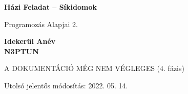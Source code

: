
\begin{titlepage}
    \begin{center}
        \vspace*{1cm}
            
        \Huge
        \textbf{Házi Feladat – Síkidomok}
            
        \vspace{0.5cm}
        \LARGE
        Programozás Alapjai 2.
            
        \vspace{2.5cm}
            
        \textbf{Idekerül Anév}\\
        \textbf{N3PTUN}
            
        \vfill
            
        A DOKUMENTÁCIÓ MÉG NEM VÉGLEGES (4. fázis)
            
        \vspace{0.8cm}
            
            
        \Large
        Utolsó jelentős módosítás: 2022. 05. 14.
        \vspace*{1cm}
            
    \end{center}
\end{titlepage}
